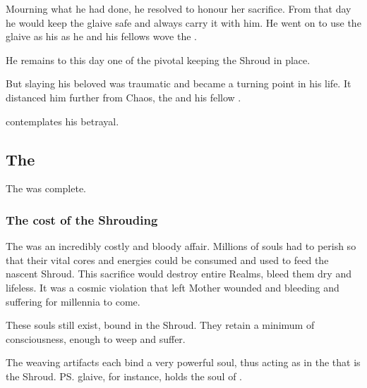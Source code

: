 Mourning what he had done, he resolved to honour her sacrifice. 
From that day he would keep the glaive safe and always carry it with him. 
He went on to use the glaive as his  as he and his fellows wove the . 

He remains to this day one of the pivotal \vertices{} keeping the Shroud in place.

But slaying his beloved was traumatic and became a turning point in his life. It distanced him further from Chaos, the \firstgendragons{} and his fellow \dragons.

\Ishnaruchaefir{} contemplates his betrayal. 










\subsection{The \SecondShrouding}
The \SecondShrouding{} was complete. 





\subsubsection{The cost of the Shrouding}
The \SecondShrouding{} was an incredibly costly and bloody affair. 
Millions of souls had to perish so that their vital cores and energies could be consumed and used to feed the nascent Shroud. 
This sacrifice would destroy entire Realms, bleed them dry and lifeless. 
It was a cosmic violation that left Mother \Miith{} wounded and bleeding and suffering for millennia to come. 

These souls still exist, bound in the Shroud. 
They retain a minimum of consciousness, enough to weep and suffer. 

The weaving artifacts each bind a very powerful soul, thus acting as \vertices{} in the \matrix{} that is the Shroud. \ps{\Ishnaruchaefir} glaive, for instance, holds the soul of \Triestessakhin. 

